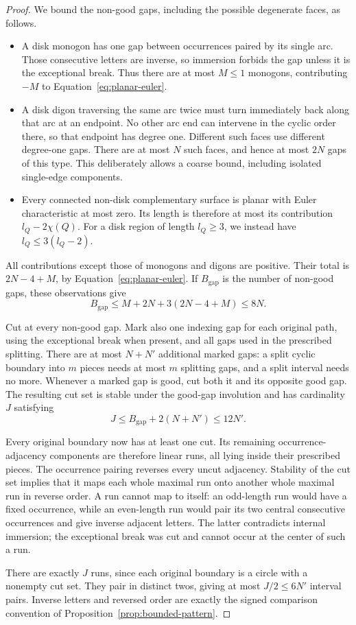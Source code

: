 \begin{proof}
We bound the non-good gaps, including the possible degenerate faces,
as follows.
\begin{itemize}
\item A disk monogon has one gap between occurrences paired by its
single arc.  Those consecutive letters are inverse, so immersion
forbids the gap unless it is the exceptional break.  Thus there are
at most $M\le1$ monogons, contributing $-M$ to
Equation~\ref{eq:planar-euler}.
\item A disk digon traversing the same arc twice must turn immediately
back along that arc at an endpoint.  No other arc end can intervene in
the cyclic order there, so that endpoint has degree one.  Different
such faces use different degree-one gaps.  There are at most $N$ such
faces, and hence at most $2N$ gaps of this type.  This deliberately
allows a coarse bound, including isolated single-edge components.
\item Every connected non-disk complementary surface is planar with
Euler characteristic at most zero.  Its length is therefore at most
its contribution $l_Q-2\chi(Q)$.  For a disk region of length $l_Q\ge3$,
we instead have $l_Q\le3(l_Q-2)$.
\end{itemize}
All contributions except those of monogons and digons are positive.
Their total is $2N-4+M$, by Equation~\ref{eq:planar-euler}.  If $B_{\mathrm{gap}}$ is
the number of non-good gaps, these observations give
\begin{equation}
 B_{\mathrm{gap}}\le M+2N+3(2N-4+M)\le8N.
 \label{eq:bad-gaps}
\end{equation}

Cut at every non-good gap.  Mark also one indexing gap for each original
path, using the exceptional break when present, and all gaps used in
the prescribed splitting.  There are at most $N+N'$ additional marked
gaps: a split cyclic boundary into $m$ pieces needs at most $m$ splitting
gaps, and a split interval needs no more.  Whenever a marked gap is
good, cut both it and its opposite good gap.  The resulting cut set is
stable under the good-gap involution and has cardinality $J$ satisfying
\[
 J\le B_{\mathrm{gap}}+2(N+N')\le12N'.
\]

Every original boundary now has at least one cut.  Its remaining
occurrence-adjacency components are therefore linear runs, all lying
inside their prescribed pieces.  The occurrence pairing reverses
every uncut adjacency.  Stability of the cut set implies that it maps
each whole maximal run onto another whole maximal run in reverse
order.  A run cannot map to itself: an odd-length run would have a fixed
occurrence, while an even-length run would pair its two central
consecutive occurrences and give inverse adjacent letters.  The latter
contradicts internal immersion; the exceptional break was cut and
cannot occur at the center of such a run.

There are exactly $J$ runs, since each original boundary is a circle
with a nonempty cut set.  They pair in distinct twos, giving at most
$J/2\le6N'$ interval pairs.  Inverse letters and reversed order are
exactly the signed comparison convention of
Proposition~\ref{prop:bounded-pattern}.
\end{proof}

